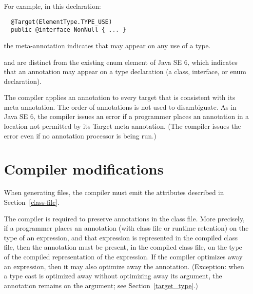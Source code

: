 \documentclass[10pt]{article}
\begin{document}
For example, in this declaration:

\begin{Verbatim}
  @Target(ElementType.TYPE_USE)
  public @interface NonNull { ... }
\end{Verbatim}

\noindent
the  meta-annotation indicates that
 may appear on any use of a type.

 and  are
distinct from the existing  enum element
of Java SE 6, which indicates that an annotation may appear on a type
declaration (a class, interface, or enum declaration).

The compiler applies an annotation to every target that is consistent with
its meta-annotation.  The order of annotations is not used to disambiguate.
As in Java SE 6, the compiler issues an error if a programmer places an
annotation in a location not permitted by its Target meta-annotation.  (The
compiler issues the error even if no annotation processor is being run.)



\section{Compiler modifications\label{mods}\label{compiler}}

% 
% 


When generating  files, the compiler must emit the attributes
described in Section~\ref{class-file}.

The compiler is required to preserve annotations in the class file.  More
precisely, if a programmer places an annotation (with class file or runtime
retention) on the type of an expression, and that expression is represented
in the compiled class file, then the annotation must be present, in the
compiled class file, on the type of the compiled representation of the
expression.  If the compiler optimizes away an expression, then it may also
optimize away the annotation.  (Exception:  when a type cast
is optimized away without optimizing away its argument, the
annotation remains on the argument; see Section~\ref{target_type}.)
\end{document}
